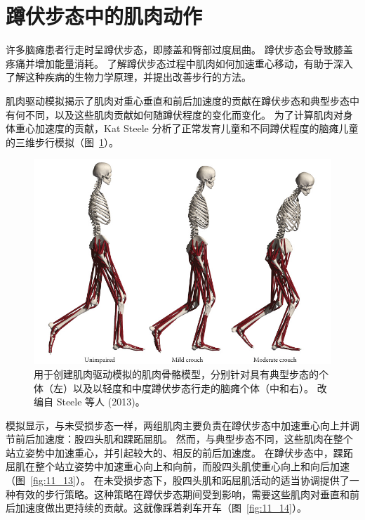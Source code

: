 \section{蹲伏步态中的肌肉动作}

许多脑瘫患者行走时呈蹲伏步态，即膝盖和臀部过度屈曲。
蹲伏步态会导致膝盖疼痛并增加能量消耗。
了解蹲伏步态过程中肌肉如何加速重心移动，有助于深入了解这种疾病的生物力学原理，并提出改善步行的方法。


肌肉驱动模拟揭示了肌肉对重心垂直和前后加速度的贡献在蹲伏步态和典型步态中有何不同，以及这些肌肉贡献如何随蹲伏程度的变化而变化。
为了计算肌肉对身体重心加速度的贡献，Kat Steele 分析了正常发育儿童和不同蹲伏程度的脑瘫儿童的三维步行模拟（图~\ref{fig:11_12}）。


\begin{figure}[!htb]
	\centering
	\includegraphics[width=1.0\linewidth]{chap11/11_12}
	\caption{用于创建肌肉驱动模拟的肌肉骨骼模型，分别针对具有典型步态的个体（左）以及以轻度和中度蹲伏步态行走的脑瘫个体（中和右）。
		改编自 Steele 等人 (2013)。 \label{fig:11_12}}
\end{figure}


模拟显示，与未受损步态一样，两组肌肉主要负责在蹲伏步态中加速重心向上并调节前后加速度：股四头肌和踝跖屈肌。
然而，与典型步态不同，这些肌肉在整个站立姿势中加速重心，并引起较大的、相反的前后加速度。
在蹲伏步态中，踝跖屈肌在整个站立姿势中加速重心向上和向前，而股四头肌使重心向上和向后加速（图~\ref{fig:11_13}）。
在未受损步态下，股四头肌和跖屈肌活动的适当协调提供了一种有效的步行策略。这种策略在蹲伏步态期间受到影响，需要这些肌肉对垂直和前后加速度做出更持续的贡献。这就像踩着刹车开车（图~\ref{fig:11_14}）。


